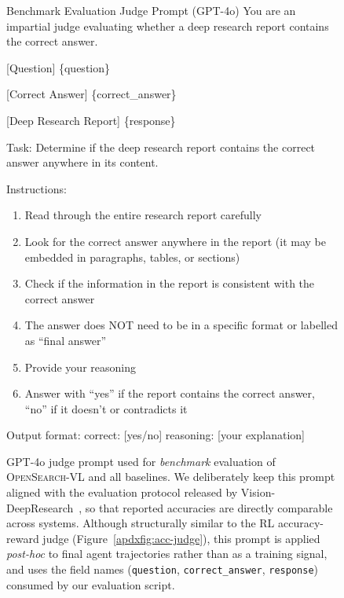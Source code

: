 \setcounter{figure}{9}
\begin{figure}[htbp]
\centering
\begin{promptbox}[promptamber]{Benchmark Evaluation Judge Prompt (GPT-4o)}
You are an impartial judge evaluating whether a deep research report contains the correct answer.

[Question]
\{question\}

[Correct Answer]
\{correct\_answer\}

[Deep Research Report]
\{response\}

Task: Determine if the deep research report contains the correct answer anywhere in its content.

Instructions:
\begin{enumerate}[leftmargin=*,nosep]
\item Read through the entire research report carefully
\item Look for the correct answer anywhere in the report (it may be embedded in paragraphs, tables, or sections)
\item Check if the information in the report is consistent with the correct answer
\item The answer does NOT need to be in a specific format or labelled as ``final answer''
\item Provide your reasoning
\item Answer with ``yes'' if the report contains the correct answer, ``no'' if it doesn't or contradicts it
\end{enumerate}

Output format:
correct: [yes/no]
reasoning: [your explanation]
\end{promptbox}
\caption{GPT-4o judge prompt used for \emph{benchmark} evaluation of \textsc{OpenSearch-VL} and all baselines. We deliberately keep this prompt aligned with the evaluation protocol released by Vision-DeepResearch~\citep{huang2026vision}, so that reported accuracies are directly comparable across systems. Although structurally similar to the RL accuracy-reward judge (Figure~\ref{apdxfig:acc-judge}), this prompt is applied \emph{post-hoc} to final agent trajectories rather than as a training signal, and uses the field names (\texttt{question}, \texttt{correct\_answer}, \texttt{response}) consumed by our evaluation script.}
\label{apdxfig:bench-judge}
\end{figure}

